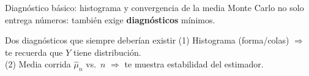 \documentclass[aspectratio=1610, 9pt]{beamer}
\begin{document}
\begin{frame}[fragile]{Diagnóstico básico: histograma y convergencia de la media}
Monte Carlo no solo entrega números: también exige \textbf{diagnósticos} mínimos.

\begin{block}{Dos diagnósticos que siempre deberían existir}
(1) Histograma (forma/colas) $\Rightarrow$ te recuerda que $Y$ tiene distribución. \\
(2) Media corrida $\widehat\mu_n$ vs.\ $n$ $\Rightarrow$ te muestra estabilidad del estimador.
\end{block}

\end{frame}


\end{document}
